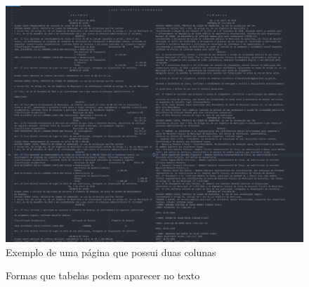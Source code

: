 \documentclass[10pt, a4paper]{article}
\begin{document}
\begin{figure}[H]
    \centering
    \includegraphics[scale=0.2]{images/prints/colunas.png}
    \caption{Exemplo de uma página que possui duas colunas}
    \label{fig:duas_colunas}
\end{figure}

\begin{figure}[H]
    \hfill
    \hfill
    \hfill

    \caption{Formas que tabelas podem aparecer no texto}
    \label{fig:tabela}
\end{figure}
\end{document}
